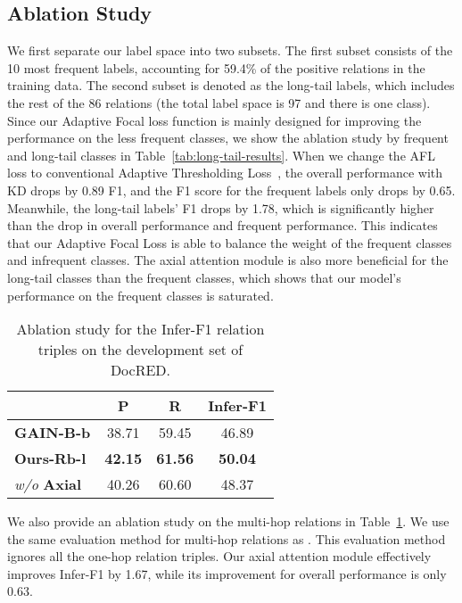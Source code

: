 \documentclass[11pt]{article}
\begin{document}
\subsection{Ablation Study}
We first separate our label space into two subsets. The first subset consists of the 10 most frequent labels, accounting for 59.4\% of the positive relations in the training data. The second subset is denoted as the long-tail labels, which includes the rest of the 86 relations (the total label space is 97 and there is one  class). Since our Adaptive Focal loss function is mainly designed for improving the performance on the less frequent classes, we show the ablation study by frequent and long-tail classes in Table~\ref{tab:long-tail-results}. When we change the AFL loss to conventional Adaptive Thresholding Loss~\citep{zhou2021document}, the overall performance with KD drops by 0.89 F1, and the F1 score for the frequent labels only drops by 0.65. Meanwhile, the long-tail labels' F1 drops by 1.78, which is significantly higher than the drop in overall performance and frequent performance. This indicates that our Adaptive Focal Loss is able to balance the weight of the frequent classes and infrequent classes. The axial attention module is also more beneficial for the long-tail classes than the frequent classes, which shows that our model's performance on the frequent classes is saturated.

\begin{table}[ht]
\centering

\begin{tabular}{lccc} 
\hline
~                 & P     & R     & Infer-F1  \\ 
\hline
\textbf{GAIN-B-b}           & 38.71 & 59.45 & 46.89           \\
\textbf{Ours-Rb-l} & \textbf{42.15} & \textbf{61.56} & \textbf{50.04}           \\
 \textit{w/o} \textbf{Axial}    & 40.26 & 60.60  & 48.37           \\
\hline
\end{tabular}

\caption{Ablation study for the Infer-F1 relation triples on the development set of DocRED.}
\label{tab:infer-result}

\end{table}

We also provide an ablation study on the multi-hop relations in Table~\ref{tab:infer-result}. We use the same evaluation method for multi-hop relations as \citet{zeng2020double}. This evaluation method ignores all the one-hop relation triples. Our axial attention module effectively improves Infer-F1 by 1.67, while its improvement for overall performance is only 0.63. 
\end{document}
